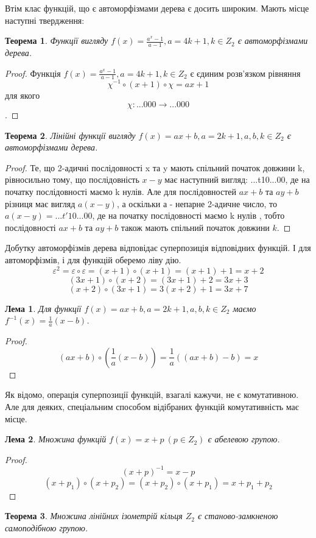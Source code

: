 \documentclass[a4paper,12pt]{article} \usepackage{a4wide}
\numberwithin{equation}{subsection}
\newtheorem{theorem}{Теорема}[subsection]
\newtheorem{lemma}{Лема}[subsection]
\begin{document}
Втім клас функцій, що є автоморфізмами дерева є досить широким.
Мають місце наступні твердження:
\begin{theorem} \label{st}Функції вигляду
$f(x)=\frac{a^x-1}{a-1}, a=4k+1, k \in Z_2$ є автоморфізмами дерева.
\end{theorem}
\begin{proof}
Функція $f(x)=\frac{a^x-1}{a-1}, a=4k+1, k \in Z_2$ є єдиним розв'язком рівняння $$\chi^{-1}\circ(x+1)\circ\chi=ax+1$$
для якого $$\chi:...000\rightarrow ...000$$.
\end{proof}
 \begin{theorem}Лінійні функції вигляду
$f(x)=ax+b, a=2k+1, a,b,k \in Z_2$ є автоморфізмами дерева.
\end{theorem}


\begin{proof}
Те, що 2-адичні послідовності x та y мають спільний
початок довжини k, рівносильно тому, що послідовність $x-y$ має
наступний вигляд: ...t10...00, де на початку послідовності маємо k
нулів. Але для послідовностей $ax+b$ та $ay+b$  різниця має вигляд
$a(x-y)$, а оскільки а - непарне 2-адичне число, то
$a(x-y)=...t'10...00$, де на початку послідовності маємо k нулів ,
тобто послідовності $ax+b$ та $ay+b$ також мають спільний початок
довжини $k$.
\end{proof}
Добутку автоморфізмів дерева відповідає суперпозиція відповідних функцій.
І для автоморфізмів, і для функцій оберемо ліву дію.
$$\varepsilon^2=\varepsilon\circ \varepsilon=(x+1)\circ (x+1)=(x+1)+1=x+2$$
$$(3x+1)\circ (x+2)=(3x+1)+2=3x+3$$
$$(x+2)\circ (3x+1)=3(x+2)+1=3x+7$$
\begin{lemma}
Для функції $f(x)=ax+b, a=2k+1, a,b,k \in Z_2$ маємо $f^{-1}(x)=\frac{1}{a}(x-b)$.
\end{lemma}
\begin{proof}
$$(ax+b)\circ (\frac{1}{a}(x-b))=\frac{1}{a}((ax+b)-b)=x$$
\end{proof}
Як відомо, операція суперпозиції функцій, взагалі кажучи, не є комутативною. Але для деяких,
 спеціальним способом відібраних функцій комутативність має місце.
\begin{lemma}
Множина функцій $f(x)=x+p\ (p\in Z_2)$ є абелевою групою.
\end{lemma}
\begin{proof}
$$(x+p)^{-1}=x-p$$
$$(x+p_1)\circ(x+p_2)=(x+p_2)\circ(x+p_1)=x+p_1+p_2$$
\end{proof}
\begin{theorem}
Множина лінійних ізометрій кільця $Z_2$ є станово-замкненою самоподібною групою.
\end{theorem}
\end{document}
